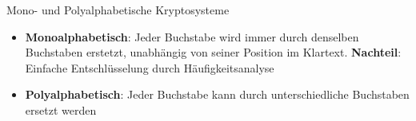 \begin{frame}{Mono- und Polyalphabetische Kryptosysteme}
	\begin{itemize}[<+->]
		\item \textbf{Monoalphabetisch}: Jeder Buchstabe wird immer durch denselben Buchstaben erstetzt, unabhängig von seiner Position im Klartext. \textbf{Nachteil}: Einfache Entschlüsselung durch Häufigkeitsanalyse
		\item \textbf{Polyalphabetisch}: Jeder Buchstabe kann durch unterschiedliche Buchstaben ersetzt werden
	\end{itemize}
\end{frame}

